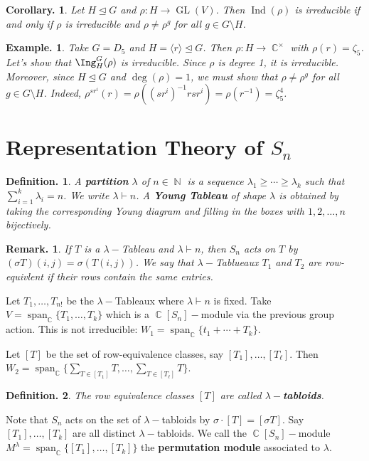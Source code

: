 \documentclass[11pt, a4paper]{memoir}
\DeclareMathOperator{\N}{{\mathbb{N}}}
\DeclareMathOperator{\C}{{\mathbb{C}}}
\theoremstyle{change}
\newtheorem{corollary}[theorem]{Corollary.}
\theoremstyle{plain}
\theoremstyle{nonumberplain}
\newtheorem{definition}{Definition.}
\newtheorem{example}{Example.}
\newtheorem{remark}{Remark.}
\DeclareMathOperator{\GL}{GL}
\DeclareMathOperator{\spn}{span}
\DeclareMathOperator{\Ind}{Ind}
\numberwithin{equation}{section}
\begin{document}
\begin{corollary}
    Let $H\trianglelefteq G$ and $\rho:H\to\GL(V)$.
    Then $\Ind(\rho)$ is irreducible if and only if $\rho$ is irreducible and $\rho\neq\rho^g$ for all $g\in G\setminus H$.
\end{corollary}
\begin{example}
    Take $G=D_5$ and $H=\langle r\rangle\trianglelefteq G$.
    Then $\rho:H\to\C^\times$ with $\rho(r)=\zeta_5$.
    Let's show that $\Ing_H^G(\rho)$ is irreducible.
    Since $\rho$ is degree 1, it is irreducible.
    Moreover, since $H\trianglelefteq G$ and $\deg(\rho)=1$, we must show that $\rho\neq\rho^g$ for all $g\in G\setminus H$.
    Indeed, $\rho^{sr^i}(r)=\rho((sr^i)^{-1}rsr^i)=\rho(r^{-1})=\zeta_5^4$.
\end{example}
\section{Representation Theory of \texorpdfstring{$S_n$}{Sn}}
\begin{definition}
    A \textbf{partition} $\lambda$ of $n\in\N$ is a sequence $\lambda_1\geq\cdots\geq\lambda_k$ such that $\sum_{i=1}^k\lambda_i=n$.
    We write $\lambda\vdash n$.
    A \textbf{Young Tableau} of shape $\lambda$ is obtained by taking the corresponding Young diagram and filling in the boxes with $1,2,\ldots,n$ bijectively.
\end{definition}
\begin{remark}
    If $T$ is a $\lambda-$Tableau and $\lambda\vdash n$, then $S_n$ acts on $T$ by $(\sigma T)(i,j)=\sigma(T(i,j))$.
    We say that $\lambda-$Tablueaux $T_1$ and $T_2$ are row-equivlent if their rows contain the same entries.
\end{remark}
Let $T_1,\ldots,T_{n!}$ be the $\lambda-$Tableaux where $\lambda\vdash n$ is fixed.
Take $V=\spn_{\C}\{T_1,\ldots,T_k\}$ which is a $\C[S_n]-$module via the previous group action.
This is not irreducible: $W_1=\spn_{\C}\{t_1+\cdots+T_k\}$.

Let $[T]$ be the set of row-equivalence classes, say $[T_1],\ldots,[T_\ell]$.
Then $W_2=\spn_{\C}\{\sum_{T\in[T_1]}T,\ldots,\sum_{T\in[T_\ell]}T\}$.
\begin{definition}
    The row equivalence classes $[T]$ are called \textbf{$\lambda-$tabloids}.
\end{definition}
Note that $S_n$ acts on the set of $\lambda-$tabloids by $\sigma\cdot[T]=[\sigma T]$.
Say $[T_1],\ldots,[T_k]$ are all distinct $\lambda-$tabloids.
We call the $\C[S_n]-$module $M^\lambda=\spn_{\C}\{[T_1],\ldots,[T_k]\}$ the \textbf{permutation module} associated to $\lambda$.
\end{document}
